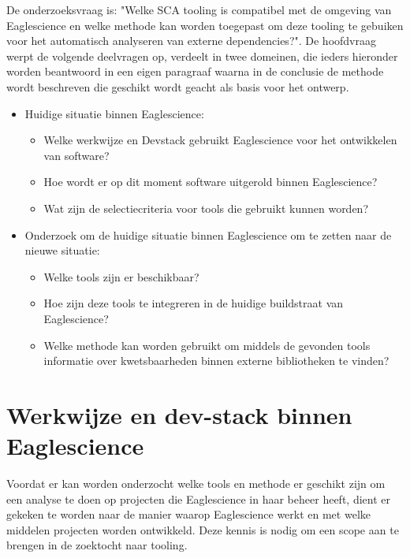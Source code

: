 De onderzoeksvraag is: "Welke SCA tooling is compatibel met de omgeving van Eaglescience en welke methode kan worden toegepast om deze tooling te gebuiken voor het automatisch analyseren van externe dependencies?". De hoofdvraag werpt de volgende deelvragen op, verdeelt in twee domeinen, die ieders hieronder worden beantwoord in een eigen paragraaf waarna in de conclusie de methode wordt beschreven die geschikt wordt geacht als basis voor het ontwerp.
\begin{itemize}
    \item Huidige situatie binnen Eaglescience:
    \begin{itemize}
        \item Welke werkwijze en Dev\-stack gebruikt Eaglescience voor het ontwikkelen van software?
        \item Hoe wordt er op dit moment software uitgerold binnen Eaglescience?
        \item Wat zijn de selectiecriteria voor tools die gebruikt kunnen worden?
    \end{itemize}

    \item Onderzoek om de huidige situatie binnen Eaglescience om te zetten naar de nieuwe situatie:
    \begin{itemize}
        \item Welke tools zijn er beschikbaar?
        \item Hoe zijn deze tools te integreren in de huidige buildstraat van Eaglescience?
        \item Welke methode kan worden gebruikt om middels de gevonden tools informatie over kwetsbaarheden binnen externe bibliotheken te vinden?
    \end{itemize}
\end{itemize}


\section{Werkwijze en dev-stack binnen Eaglescience}\label{sec:werkwijze-en-dev-stack-binnen-eaglescience}
Voordat er kan worden onderzocht welke tools en methode er geschikt zijn om een analyse te doen op projecten die Eaglescience in haar beheer heeft, dient er gekeken te worden naar de manier waarop Eaglescience werkt en met welke middelen projecten worden ontwikkeld. Deze kennis is nodig om een scope aan te brengen in de zoektocht naar tooling.

